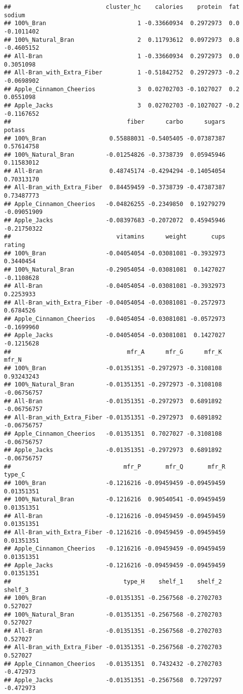 \documentclass[
]{article}
\begin{document}
\begin{verbatim}
##                           cluster_hc    calories    protein  fat     sodium
## 100%_Bran                          1 -0.33660934  0.2972973  0.0 -0.1011402
## 100%_Natural_Bran                  2  0.11793612  0.0972973  0.8 -0.4605152
## All-Bran                           1 -0.33660934  0.2972973  0.0  0.3051098
## All-Bran_with_Extra_Fiber          1 -0.51842752  0.2972973 -0.2 -0.0698902
## Apple_Cinnamon_Cheerios            3  0.02702703 -0.1027027  0.2  0.0551098
## Apple_Jacks                        3  0.02702703 -0.1027027 -0.2 -0.1167652
##                                 fiber      carbo      sugars      potass
## 100%_Bran                  0.55888031 -0.5405405 -0.07387387  0.57614758
## 100%_Natural_Bran         -0.01254826 -0.3738739  0.05945946  0.11583012
## All-Bran                   0.48745174 -0.4294294 -0.14054054  0.70313170
## All-Bran_with_Extra_Fiber  0.84459459 -0.3738739 -0.47387387  0.73487773
## Apple_Cinnamon_Cheerios   -0.04826255 -0.2349850  0.19279279 -0.09051909
## Apple_Jacks               -0.08397683 -0.2072072  0.45945946 -0.21750322
##                              vitamins      weight       cups     rating
## 100%_Bran                 -0.04054054 -0.03081081 -0.3932973  0.3440454
## 100%_Natural_Bran         -0.29054054 -0.03081081  0.1427027 -0.1108628
## All-Bran                  -0.04054054 -0.03081081 -0.3932973  0.2253933
## All-Bran_with_Extra_Fiber -0.04054054 -0.03081081 -0.2572973  0.6784526
## Apple_Cinnamon_Cheerios   -0.04054054 -0.03081081 -0.0572973 -0.1699960
## Apple_Jacks               -0.04054054 -0.03081081  0.1427027 -0.1215628
##                                 mfr_A      mfr_G      mfr_K       mfr_N
## 100%_Bran                 -0.01351351 -0.2972973 -0.3108108  0.93243243
## 100%_Natural_Bran         -0.01351351 -0.2972973 -0.3108108 -0.06756757
## All-Bran                  -0.01351351 -0.2972973  0.6891892 -0.06756757
## All-Bran_with_Extra_Fiber -0.01351351 -0.2972973  0.6891892 -0.06756757
## Apple_Cinnamon_Cheerios   -0.01351351  0.7027027 -0.3108108 -0.06756757
## Apple_Jacks               -0.01351351 -0.2972973  0.6891892 -0.06756757
##                                mfr_P       mfr_Q       mfr_R     type_C
## 100%_Bran                 -0.1216216 -0.09459459 -0.09459459 0.01351351
## 100%_Natural_Bran         -0.1216216  0.90540541 -0.09459459 0.01351351
## All-Bran                  -0.1216216 -0.09459459 -0.09459459 0.01351351
## All-Bran_with_Extra_Fiber -0.1216216 -0.09459459 -0.09459459 0.01351351
## Apple_Cinnamon_Cheerios   -0.1216216 -0.09459459 -0.09459459 0.01351351
## Apple_Jacks               -0.1216216 -0.09459459 -0.09459459 0.01351351
##                                type_H    shelf_1    shelf_2   shelf_3
## 100%_Bran                 -0.01351351 -0.2567568 -0.2702703  0.527027
## 100%_Natural_Bran         -0.01351351 -0.2567568 -0.2702703  0.527027
## All-Bran                  -0.01351351 -0.2567568 -0.2702703  0.527027
## All-Bran_with_Extra_Fiber -0.01351351 -0.2567568 -0.2702703  0.527027
## Apple_Cinnamon_Cheerios   -0.01351351  0.7432432 -0.2702703 -0.472973
## Apple_Jacks               -0.01351351 -0.2567568  0.7297297 -0.472973
\end{verbatim}
\end{document}
